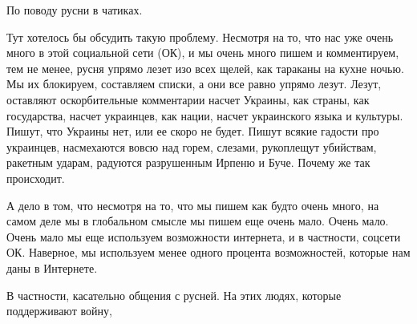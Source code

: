  
 
 
 
 

По поводу русни в чатиках.

Тут хотелось бы обсудить такую проблему.  Несмотря на то, что нас уже очень
много в этой социальной сети (ОК), и мы очень много пишем и комментируем, тем
не менее, русня упрямо лезет изо всех щелей, как тараканы на кухне ночью. Мы их
блокируем, составляем списки, а они все равно упрямо лезут. Лезут, оставляют
оскорбительные комментарии насчет Украины, как страны, как государства, насчет
украинцев, как нации, насчет украинского языка и культуры. Пишут, что Украины
нет, или ее скоро не будет. Пишут всякие гадости про украинцев, насмехаются
вовсю над горем, слезами, рукоплещут убийствам, ракетным ударам, радуются
разрушенным Ирпеню и Буче. Почему же так происходит.

А дело в том, что несмотря на то, что мы пишем как будто очень много, на самом
деле мы в глобальном смысле мы пишем еще очень мало. Очень мало. Очень мало мы
еще используем возможности интернета, и в частности, соцсети ОК. Наверное, мы
используем менее одного процента возможностей, которые нам даны в Интернете.

В частности, касательно общения с русней. На этих людях, которые поддерживают
войну,


